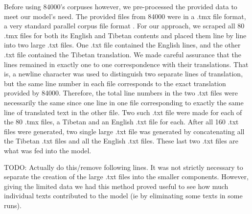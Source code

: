 \documentclass[letterpaper, 10 pt, conference]{ieeeconf}  %
\begin{document}
Before using 84000's corpuses however, we pre-processed the provided data to meet our model's need. The provided files from 84000 were in a .tmx file format, a very standard parallel corpus file format \cite{c9}. 
For our approach, we scraped all 80 .tmx files for both its English and Tibetan contents and placed them line by line into two large .txt files. One .txt file contained the English lines, and the other .txt file contained the Tibetan translation. We made careful assurance that the lines remained in exactly one to one correspondence with their translations. That is, a newline character was used to distinguish two separate lines of translation, but the same line number in each file corresponds to the exact translation provided by 84000. Therefore, the total line numbers in the two .txt files were necessarily the same since one line in one file corresponding to exactly the same line of translated text in the other file. Two such .txt file were made for each of the 80 .tmx files, a Tibetan and an English .txt file for each. After all 160 .txt files were generated, two single large .txt file was generated by concatenating all the Tibetan .txt files and all the English .txt files. These last two .txt files are what was fed into the model.

TODO: Actually do this/remove following lines. It was not strictly necessary to separate the creation of the large .txt files into the smaller components. However, giving the limited data we had this method proved useful to see how much individual texts contributed to the model (ie by eliminating some texts in some runs). 
\end{document}
